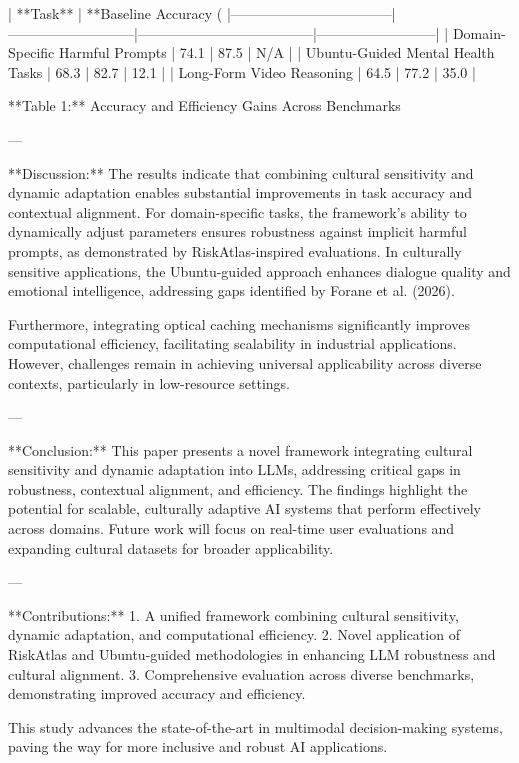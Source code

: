| **Task**                          | **Baseline Accuracy (%
|-----------------------------------|---------------------------|--------------------------------------|--------------------------|  
| Domain-Specific Harmful Prompts   | 74.1                     | 87.5                                 | N/A                      |  
| Ubuntu-Guided Mental Health Tasks | 68.3                     | 82.7                                 | 12.1                    |  
| Long-Form Video Reasoning         | 64.5                     | 77.2                                 | 35.0                    |  

**Table 1:** Accuracy and Efficiency Gains Across Benchmarks  

---

**Discussion:**  
The results indicate that combining cultural sensitivity and dynamic adaptation enables substantial improvements in task accuracy and contextual alignment. For domain-specific tasks, the framework's ability to dynamically adjust parameters ensures robustness against implicit harmful prompts, as demonstrated by RiskAtlas-inspired evaluations. In culturally sensitive applications, the Ubuntu-guided approach enhances dialogue quality and emotional intelligence, addressing gaps identified by Forane et al. (2026).  

Furthermore, integrating optical caching mechanisms significantly improves computational efficiency, facilitating scalability in industrial applications. However, challenges remain in achieving universal applicability across diverse contexts, particularly in low-resource settings.  

---

**Conclusion:**  
This paper presents a novel framework integrating cultural sensitivity and dynamic adaptation into LLMs, addressing critical gaps in robustness, contextual alignment, and efficiency. The findings highlight the potential for scalable, culturally adaptive AI systems that perform effectively across domains. Future work will focus on real-time user evaluations and expanding cultural datasets for broader applicability.  

---

**Contributions:**  
1. A unified framework combining cultural sensitivity, dynamic adaptation, and computational efficiency.  
2. Novel application of RiskAtlas and Ubuntu-guided methodologies in enhancing LLM robustness and cultural alignment.  
3. Comprehensive evaluation across diverse benchmarks, demonstrating improved accuracy and efficiency.  

This study advances the state-of-the-art in multimodal decision-making systems, paving the way for more inclusive and robust AI applications.